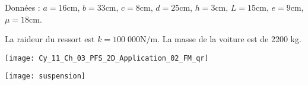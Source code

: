 Données : $a = 16 \text{cm}$, $b = 33 \text{cm}$, $c = 8 \text{cm}$, $d = 25 \text{cm}$, $h = 3 \text{cm}$, $L = 15 \text{cm}$, $e = 9 \text{cm}$, $\mu = 18 \text{cm}$. 

La raideur du ressort est $k = 100\;000 \text{N/m}$. La masse de la voiture est de 2200 kg.


\ifprof
\else
\begin{marginfigure}
\centering
\texttt{[image: Cy\_11\_Ch\_03\_PFS\_2D\_Application\_02\_FM\_qr]}
\end{marginfigure}
\fi

\begin{center}
\texttt{[image: suspension]}
\end{center}

